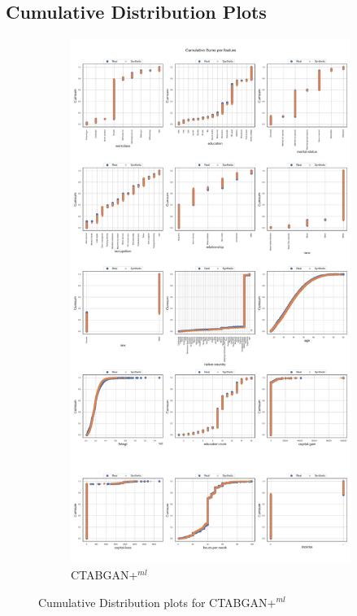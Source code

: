 
\newpage
\subsection[]{Cumulative Distribution Plots}
\label{A:cumsum}
\begin{figure}[h]
	\centering
	\begin{subfigure}{0.6\textwidth}
		\includegraphics[width=\linewidth]{images/cumsums/ctabgan+.jpg}
		\caption{CTABGAN+$^{ml}$}
	\end{subfigure}
	\caption[Cumulative Distribution plots CTABGAN+ Model]{Cumulative Distribution plots for CTABGAN+$^{ml}$}
	\label{fig_a:cumsum_0}
\end{figure}
\newpage

